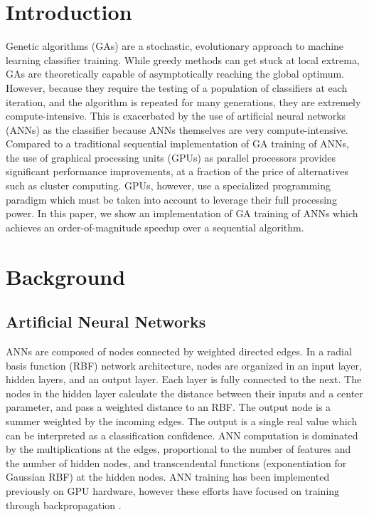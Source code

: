 \documentclass[11pt]{article}       %
\begin{document}
\section{Introduction} \label{intro}
Genetic algorithms (GAs) are a stochastic, evolutionary approach to machine learning classifier training. While greedy methods can get stuck at local extrema, GAs  are theoretically capable of asymptotically reaching the global optimum. However, because they require the testing of a population of classifiers at each iteration, and the algorithm is repeated for many generations, they are extremely compute-intensive. This is exacerbated by the use of artificial neural networks (ANNs) as the classifier because ANNs themselves are very compute-intensive. Compared to a traditional sequential implementation of GA training of ANNs, the use of graphical processing units (GPUs) as parallel processors provides significant performance improvements, at a fraction of the price of alternatives such as cluster computing. GPUs, however, use a specialized programming paradigm which must be taken into account to leverage their full processing power. In this paper, we show an implementation of GA training of ANNs which achieves an order-of-magnitude speedup over a sequential algorithm.

\section{Background} \label{background}

\subsection{Artificial Neural Networks} \label{ann}
ANNs are composed of nodes connected by weighted directed edges. In a radial basis function (RBF) network architecture, nodes are organized in an input layer, hidden layers, and an output layer. Each layer is fully connected to the next. The nodes in the hidden layer calculate the distance between their inputs and a center parameter, and pass a weighted distance to an RBF. The output node is a summer weighted by the incoming edges. The output is a single real value which can be interpreted as a classification confidence. ANN computation is dominated by the multiplications at the edges, proportional to the number of features and the number of hidden nodes, and transcendental functions (exponentiation for Gaussian RBF) at the hidden nodes.  ANN training has been implemented previously on GPU hardware, however these efforts have focused on training through backpropagation \cite{backprop}.
\end{document}
